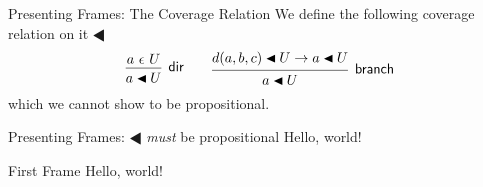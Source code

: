 \documentclass{beamer}
\begin{document}
\begin{frame}{Presenting Frames: The Coverage Relation}
  We define the following \alert{coverage} relation on it $\LHD$
  \[
    \begin{prooftree}
      \hypo{ a~\epsilon~U }
      \infer1[\textsf{dir}]{a \LHD U}
    \end{prooftree}
    \qquad
    \begin{prooftree}
      \hypo{d(a, b, c) \LHD U \rightarrow a \LHD U}
      \infer1[\textsf{branch}]{a \LHD U}
    \end{prooftree}
  \]
  which we cannot show to be propositional.
\end{frame}

\begin{frame}{Presenting Frames: $\LHD$ \emph{must} be propositional}
  Hello, world!
\end{frame}

\begin{frame}{First Frame}
  Hello, world!
\end{frame}
\end{document}
